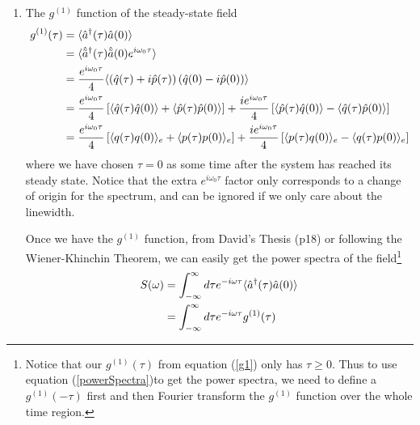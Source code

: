 \documentclass{article}
\begin{document}
\begin{enumerate}
    \item The $g^{(1)}$ function of the steady-state field
        \begin{align}
                \label{g1}
            \notag g^{(1)}(\tau) &= \langle \hat{a}^\dagger(\tau) \hat{a}(0) \rangle\\
            \notag   &= \langle \hat{\tilde{a}}^\dagger(\tau) \hat{\tilde{a}}(0) e^{i\omega_0 \tau}\rangle\\
            \notag   &= \frac{e^{i\omega_0 \tau}}{4} \langle \left( \hat{q}(\tau)+i\hat{p}(\tau)\right)\left(\hat{q}(0)-i\hat{p}(0) \right)\rangle\\
            \notag   &= \frac{e^{i\omega_0 \tau}}{4} \left[\langle\hat{q}(\tau)\hat{q}(0)\rangle+\langle\hat{p}(\tau)\hat{p}(0)\rangle\right]+\frac{ie^{i\omega_0 \tau}}{4}\left[\langle\hat{p}(\tau)\hat{q}(0)\rangle-\langle\hat{q}(\tau)\hat{p}(0)\rangle\right]\\
                     &= \frac{e^{i\omega_0 \tau}}{4} \left[\langle q(\tau)q(0)\rangle_e+\langle p(\tau)p(0)\rangle_e\right]+\frac{ie^{i\omega_0 \tau}}{4}\left[\langle p(\tau)q(0)\rangle_e-\langle q(\tau)p(0)\rangle_e\right]
        \end{align}
        where we have chosen $\tau = 0$ as some time after the system has reached its steady state. Notice that the extra $e^{i\omega_0 \tau}$ factor only corresponds to a change of origin for the spectrum, and can be ignored if we only care about the linewidth.
        
    Once we have the $g^{(1)}$ function, from David's Thesis (p18) or following the Wiener-Khinchin Theorem, we can easily get the power spectra of the field\footnote{Notice that our $g^{(1)}(\tau)$ from equation (\ref{g1}) only has $\tau \geq 0$. Thus to use equation (\ref{powerSpectra})to get the power spectra, we need to define a $g^{(1)}(-\tau)$ first and then Fourier transform the $g^{(1)}$ function over the whole time region.} 
    \begin{align}
     \label{powerSpectra}
        \notag    S(\omega) &= \int_{-\infty}^{\infty}d\tau e^{-i\omega \tau}\langle\hat{a}^\dagger(\tau)\hat{a}(0)\rangle\\
                  &= \int_{-\infty}^{\infty}d\tau e^{-i\omega \tau}g^{(1)}(\tau)
    \end{align}
    

\end{enumerate}
\end{document}
